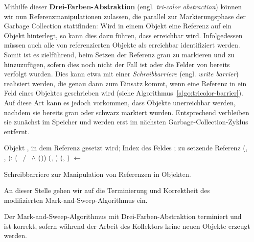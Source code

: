 Mithilfe dieser \textbf{Drei-Farben-Abstraktion} (engl. \textit{tri-color abstraction}) können wir nun Referenzmanipulationen zulassen, die parallel zur Markierungsphase der Garbage Collection stattfinden:
Wird in einem Objekt  eine Referenz auf ein Objekt  hinterlegt, so kann dies dazu führen, dass  erreichbar wird.
Infolgedessen müssen auch alle von  referenzierten Objekte als erreichbar identifiziert werden.
Somit ist es zielführend,  beim Setzen der Referenz grau zu markieren und zu  hinzuzufügen, sofern dies noch nicht der Fall ist oder die Felder von  bereits verfolgt wurden.
Dies kann etwa mit einer \textit{Schreibbarriere} (engl. \textit{write barrier}) realisiert werden, die genau dann zum Einsatz kommt, wenn eine Referenz in ein Feld eines Objektes geschrieben wird (siehe Algorithmus~\ref{algo:tricolor-barrier}).
Auf diese Art kann es jedoch vorkommen, dass Objekte unerreichbar werden, nachdem sie bereits grau oder schwarz markiert wurden.
Entsprechend verbleiben sie zunächst im Speicher und werden erst im nächsten Garbage-Collection-Zyklus entfernt.

\begin{algorithm}[h]
\begin{algorithmic}[1]
	\Input Objekt , in dem Referenz gesetzt wird; Index des Feldes ; zu setzende Referenz 
	\State \Atomic {}(, , ):
	\State \quad \IF ( $\neq$ \Null $\wedge$ ())
	\State \quad \quad {}(, )
	\State \quad \quad {}(, )
	\State \quad {} $\gets$ 
\end{algorithmic}
\caption[Schreibbarriere zur Manipulation von Referenzen]{Schreibbarriere zur Manipulation von Referenzen in Objekten.}
\label{algo:tricolor-barrier}
\end{algorithm}

An dieser Stelle gehen wir auf die Terminierung und Korrektheit des modifizierten Mark-and-Sweep-Algorithmus ein.

\begin{mybox}
\begin{satz}
	Der Mark-and-Sweep-Algorithmus mit Drei-Farben-Abstraktion terminiert und ist korrekt, sofern während der Arbeit des Kollektors keine neuen Objekte erzeugt werden.
\end{satz}
\end{mybox}

